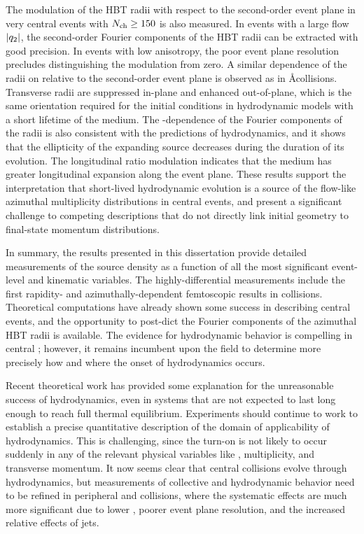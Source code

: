 The modulation of the HBT radii with respect to the second-order event plane in very central \pPb events with $\mbox{$N_{\mathrm{ch}}$} \geq 150$ is also measured.
In events with a large flow $|q_{2}|$, the second-order Fourier components of the HBT radii can be extracted with good precision.
In events with low anisotropy, the poor event plane resolution precludes distinguishing the modulation from zero.
A similar dependence of the radii on \tdpk relative to the second-order event plane is observed as in \AA collisions.
Transverse radii are suppressed in-plane and enhanced out-of-plane, which is the same orientation required for the initial conditions in hydrodynamic models with a short lifetime of the medium.
The \kt-dependence of the Fourier components of the radii is also consistent with the predictions of hydrodynamics, and it shows that the ellipticity of the expanding source decreases during the duration of its evolution.
The longitudinal ratio \Rlong modulation indicates that the medium has greater longitudinal expansion along the event plane.
These results support the interpretation that short-lived hydrodynamic evolution is a source of the flow-like azimuthal multiplicity distributions in central \pPb events, and present a significant challenge to competing descriptions that do not directly link initial geometry to final-state momentum distributions.

In summary, the results presented in this dissertation provide detailed measurements of the \pPb source density as a function of all the most significant event-level and kinematic variables.
The highly-differential measurements include the first rapidity- and azimuthally-dependent femtoscopic results in \pA collisions.
Theoretical computations have already shown some success in describing central \pPb events, and the opportunity to post-dict the Fourier components of the azimuthal HBT radii is available.
The evidence for hydrodynamic behavior is compelling in central \pPb; however, it remains incumbent upon the field to determine more precisely how and where the onset of hydrodynamics occurs.

Recent theoretical work has provided some explanation for the unreasonable success of hydrodynamics, even in systems that are not expected to last long enough to reach full thermal equilibrium.
Experiments should continue to work to establish a precise quantitative description of the domain of applicability of hydrodynamics.
This is challenging, since the turn-on is not likely to occur suddenly in any of the relevant physical variables like \Npart, multiplicity, and transverse momentum.
It now seems clear that central \pPb collisions evolve through hydrodynamics, but measurements of collective and hydrodynamic behavior need to be refined in peripheral \pPb and \pp collisions, where the systematic effects are much more significant due to lower \Nch, poorer event plane resolution, and the increased relative effects of jets.

